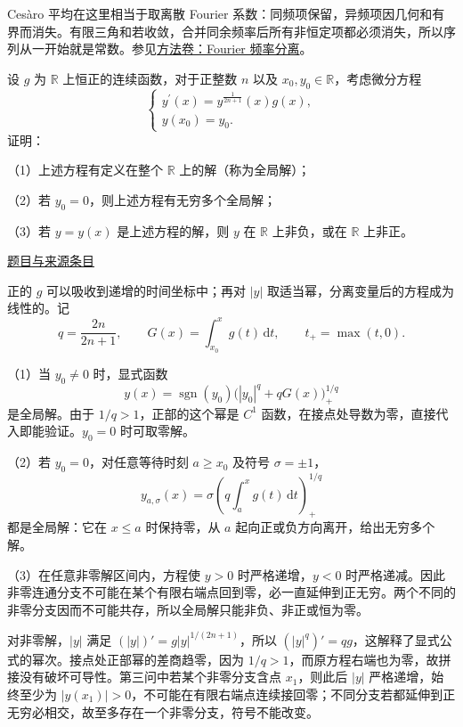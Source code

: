 \documentclass[12pt,fontset=fandol]{ctexart}
\begin{document}
\begin{remark}[方法与条件]Cesàro 平均在这里相当于取离散 Fourier 系数：同频项保留，异频项因几何和有界而消失。有限三角和若收敛，合并同余频率后所有非恒定项都必须消失，所以序列从一开始就是常数。参见\hyperref[app:integration-fourier]{方法卷：Fourier 频率分离}。\end{remark}

\begin{example}\label{ex:fin12-low:9}\label{pr:fin12-low:9}

设 $g$ 为 $\mathbb{R}$ 上恒正的连续函数，对于正整数 $n$ 以及 $x_{0}, y_{0} \in \mathbb{R}$，考虑微分方程
\[
\begin{cases} y^{\prime}(x) = y^{\frac{1}{2n+1}}(x) g(x), \\ y\left(x_{0}\right) = y_{0}. \end{cases}
\]
证明：

（1）上述方程有定义在整个 $\mathbb{R}$ 上的解（称为全局解）；

（2）若 $y_{0} = 0$，则上述方程有无穷多个全局解；

（3）若 $y = y(x)$ 是上述方程的解，则 $y$ 在 $\mathbb{R}$ 上非负，或在 $\mathbb{R}$ 上非正。

\par\href{https://github.com/lzxcr/cmc-mathematics/blob/64916fa1fdbc3e444a652eca204d5669058ee321/src/problems/finals/12/10.md}{题目与来源条目}

\end{example}

\begin{solve}\label{ans:fin12-low:9}

正的 $g$ 可以吸收到递增的时间坐标中；再对 $|y|$ 取适当幂，分离变量后的方程成为线性的。记
\[
q=\frac{2n}{2n+1},\qquad G(x)=\int_{x_0}^xg(t)\,\mathrm dt,\qquad t_+=\max(t,0).
\]

（1）当 $y_0\ne0$ 时，显式函数
\[
y(x)=\operatorname{sgn}(y_0)\bigl(|y_0|^q+qG(x)\bigr)_+^{1/q}
\]
是全局解。由于 $1/q>1$，正部的这个幂是 $C^1$ 函数，在接点处导数为零，直接代入即能验证。$y_0=0$ 时可取零解。

（2）若 $y_0=0$，对任意等待时刻 $a\geq x_0$ 及符号 $\sigma=\pm1$，
\[
y_{a,\sigma}(x)=\sigma\left(q\int_a^xg(t)\,\mathrm dt\right)_+^{1/q}
\]
都是全局解：它在 $x\leq a$ 时保持零，从 $a$ 起向正或负方向离开，给出无穷多个解。

（3）在任意非零解区间内，方程使 $y>0$ 时严格递增，$y<0$ 时严格递减。因此非零连通分支不可能在某个有限右端点回到零，必一直延伸到正无穷。两个不同的非零分支因而不可能共存，所以全局解只能非负、非正或恒为零。

对非零解，$|y|$ 满足 $(|y|)'=g|y|^{1/(2n+1)}$，所以 $(|y|^q)'=qg$，这解释了显式公式的幂次。接点处正部幂的差商趋零，因为 $1/q>1$，而原方程右端也为零，故拼接没有破坏可导性。第三问中若某个非零分支含点 $x_1$，则此后 $|y|$ 严格递增，始终至少为 $|y(x_1)|>0$，不可能在有限右端点连续接回零；不同分支若都延伸到正无穷必相交，故至多存在一个非零分支，符号不能改变。

\end{solve}
\end{document}

